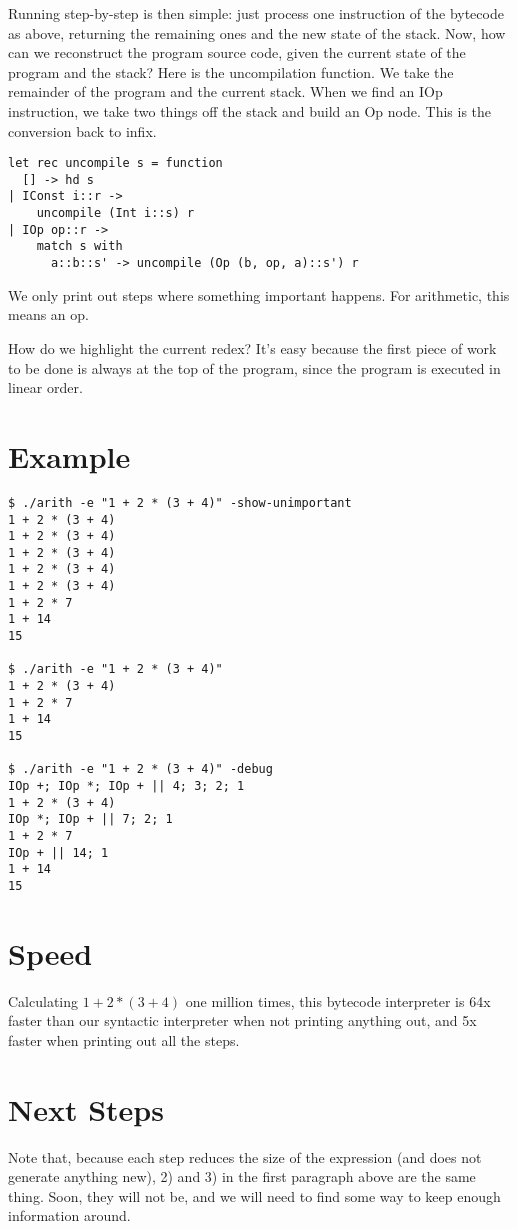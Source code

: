 \documentclass[10pt]{article}
\begin{document}
Running step-by-step is then simple: just process one instruction of the bytecode as above, returning the remaining ones and the new state of the stack. Now, how can we reconstruct the program source code, given the current state of the program and the stack? Here is the uncompilation function. We take the remainder of the program and the current stack. When we find an IOp instruction, we take two things off the stack and build an Op node. This is the conversion back to infix.

\begin{verbatim}
let rec uncompile s = function
  [] -> hd s
| IConst i::r ->
    uncompile (Int i::s) r
| IOp op::r ->
    match s with
      a::b::s' -> uncompile (Op (b, op, a)::s') r
\end{verbatim}


We only print out steps where something important happens. For arithmetic, this means an op.

How do we highlight the current redex? It's easy because the first piece of work to be done is always at the top of the program, since the program is executed in linear order.

\section*{Example}

\begin{verbatim}
$ ./arith -e "1 + 2 * (3 + 4)" -show-unimportant
1 + 2 * (3 + 4)
1 + 2 * (3 + 4)
1 + 2 * (3 + 4)
1 + 2 * (3 + 4)
1 + 2 * (3 + 4)
1 + 2 * 7
1 + 14
15

$ ./arith -e "1 + 2 * (3 + 4)"
1 + 2 * (3 + 4)
1 + 2 * 7
1 + 14
15

$ ./arith -e "1 + 2 * (3 + 4)" -debug
IOp +; IOp *; IOp + || 4; 3; 2; 1
1 + 2 * (3 + 4)
IOp *; IOp + || 7; 2; 1
1 + 2 * 7
IOp + || 14; 1
1 + 14
15
\end{verbatim}

\section*{Speed}
Calculating $1 + 2 * (3 + 4)$ one million times, this bytecode interpreter is 64x faster than our syntactic interpreter when not printing anything out, and 5x faster when printing out all the steps.

\section*{Next Steps}

Note that, because each step reduces the size of the expression (and does not generate anything new), 2) and 3) in the first paragraph above are the same thing. Soon, they will not be, and we will need to find some way to keep enough information around.
\end{document}
